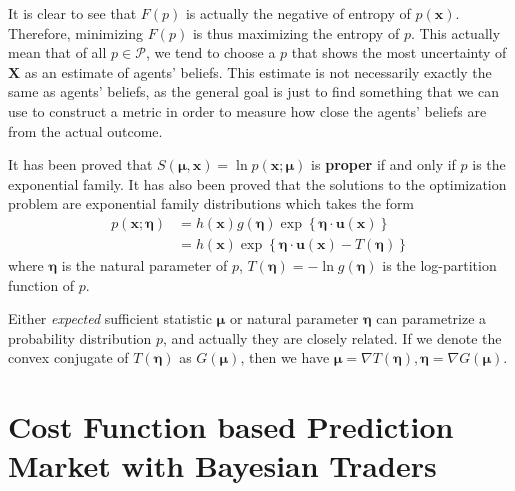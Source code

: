 \documentclass[12pt]{article}
\begin{document}
It is clear to see that $F(p)$ is actually the negative of entropy of $p(\mathbf{x})$. Therefore, minimizing $F(p)$ is thus maximizing the entropy of $p$. This actually mean that of all $p\in \mathcal{P}$, we tend to choose a $p$ that shows the most uncertainty of $\mathbf{X}$ as an estimate of agents' beliefs. This estimate is not necessarily exactly the same as agents' beliefs, as the general goal is just to find something that we can use to construct a metric in order to measure how close the agents' beliefs are from the actual outcome.

It has been proved that $S(\bm{\mu},\mathbf{x})=\ln p(\mathbf{x};\bm{\mu})$ is \textbf{proper} if and only if $p$ is the exponential family. It has also been proved that the solutions to the optimization problem are exponential family distributions which takes the form 
\begin{align*}
    p(\mathbf{x};\bm{\eta})&=h(\mathbf{x})g(\bm{\eta})\exp\left\{ \bm{\eta}\cdot\mathbf{u}(\mathbf{x})\right\}\\
    &=h(\mathbf{x})\exp\left\{ \bm{\eta}\cdot\mathbf{u}(\mathbf{x})-T(\bm{\eta})\right\}
\end{align*}
where $\bm{\eta}$ is the natural parameter of $p$, $T(\bm{\eta})=-\ln g(\bm{\eta})$ is the log-partition function of $p$.

Either \textit{expected} sufficient statistic $\bm{\mu}$ or natural parameter $\bm{\eta}$ can parametrize a probability distribution $p$, and actually they are closely related. If we denote the convex conjugate of $T(\bm{\eta})$ as $G(\bm{\mu})$, then we have $\bm{\mu}=\nabla T(\bm{\eta}),\bm{\eta}=\nabla G(\bm{\mu})$.

\newpage
\section{Cost Function based Prediction Market with Bayesian Traders}
\end{document}
